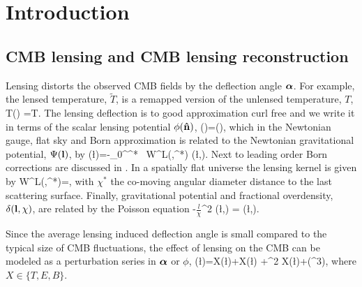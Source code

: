 \documentclass[prd,superscriptaddress,nofootinbib,floatfix,notitlepage]{revtex4-1}
\begin{document}
\maketitle

\section{Introduction}


\subsection{CMB lensing and CMB lensing reconstruction}

Lensing distorts the observed CMB fields by the deflection angle ${\boldsymbol{\alpha}}$. For example, the lensed temperature, $\tilde T$, is a remapped version of the unlensed temperature, $T$,
\beq
\label{eq:1}
\tilde T(\vn) =T\left[\vn+\va(\vn)\right].
\eeq 
The lensing deflection is to good approximation curl free and we write it in terms of the scalar lensing potential $\phi({\bf\hat{n}})$,
\beq
\label{eq:2}
\va(\vn)=\nabla \phi(\vn),
\eeq
which in the Newtonian gauge, flat sky and Born approximation is related to the Newtonian gravitational potential, $\Psi({\bf l})$, by
\beq
\label{eq:phi}
\phi(\l)=-\int_0^{\chi^*} \ud \chi\, W^{L}(\chi,\chi^*) \Psi(\l,\chi).
\eeq
Next to leading order Born corrections are discussed in . In a spatially flat universe the lensing kernel is given by
\beq
W^{L}(\chi,\chi^*)=\frac{\chi^*-\chi}{\chi\chi^*},
\eeq
with $\chi^*$ the co-moving angular diameter distance to the last scattering surface.
Finally, gravitational potential and fractional overdensity, $\delta({\bf l},\chi)$, are related by the Poisson equation
\beq
-\(\frac{l}{\chi}\)^2 \Psi(\l,\chi) =  \delta(\l,\chi).
\eeq


Since the average lensing induced deflection angle is small compared to the typical size of CMB fluctuations, the effect of lensing on the CMB can be modeled as a perturbation series in ${\boldsymbol{\alpha}}$ or $\phi$,
\beq
{}(\l)=X(\l)+\delta X(\l) +\delta^2 X(\l)+(\phi^3),
\eeq
where $X\in \{T,E,B\}$.
\end{document}
